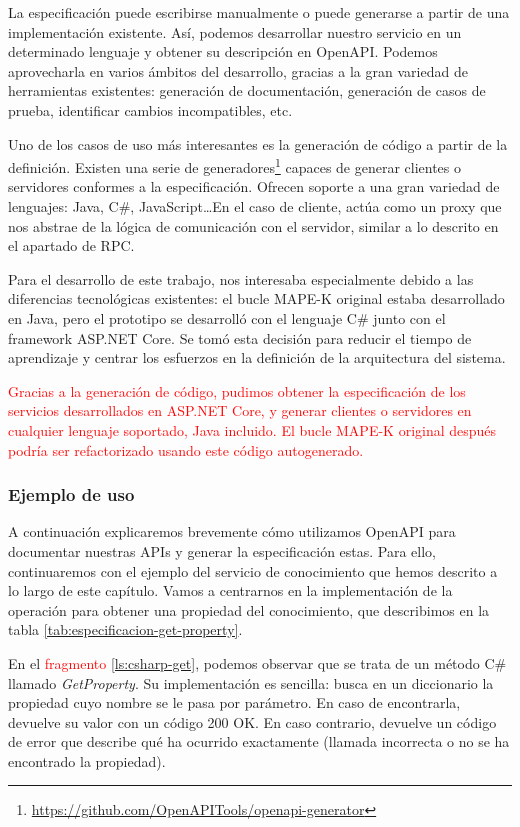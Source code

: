 La especificación puede escribirse manualmente o puede generarse a partir de una implementación existente. Así, podemos desarrollar nuestro servicio en un determinado lenguaje y obtener su descripción en OpenAPI. Podemos aprovecharla en varios ámbitos del desarrollo, gracias a la gran variedad de herramientas existentes: generación de documentación, generación de casos de prueba, identificar cambios incompatibles, etc. \cite{westerveldChapterOpenAPIAPI2021}

Uno de los casos de uso más interesantes es la generación de código a partir de la definición. Existen una serie de generadores\footnote{\url{https://github.com/OpenAPITools/openapi-generator}} capaces de generar clientes o servidores conformes a la especificación. Ofrecen soporte a una gran variedad de lenguajes: Java, C\#, JavaScript\dots En el caso de cliente, actúa como un proxy que nos abstrae de la lógica de comunicación con el servidor, similar a lo descrito en el apartado de RPC.

Para el desarrollo de este trabajo, nos interesaba especialmente debido a las diferencias tecnológicas existentes: el bucle MAPE-K original estaba desarrollado en Java, pero el prototipo se desarrolló con el lenguaje C\# junto con el framework ASP.NET Core. Se tomó esta decisión para reducir el tiempo de aprendizaje y centrar los esfuerzos en la definición de la arquitectura del sistema.

\textcolor{red}{Gracias a la generación de código, pudimos obtener la especificación de los servicios desarrollados en ASP.NET Core, y generar clientes o servidores en cualquier lenguaje soportado, Java incluido. El bucle MAPE-K original después podría ser refactorizado usando este código autogenerado.}

\subsubsection{Ejemplo de uso}

A continuación explicaremos brevemente cómo utilizamos OpenAPI para documentar nuestras APIs y generar la especificación estas. Para ello, continuaremos con el ejemplo del servicio de conocimiento que hemos descrito a lo largo de este capítulo. Vamos a centrarnos en la implementación de la operación para obtener una propiedad del conocimiento, que describimos en la tabla \ref{tab:especificacion-get-property}.

En el \textcolor{red}{fragmento} \ref{ls:csharp-get}, podemos observar que se trata de un método C\# llamado \textit{GetProperty}. Su implementación es sencilla: busca en un diccionario la propiedad cuyo nombre se le pasa por parámetro. En caso de encontrarla, devuelve su valor con un código 200 OK. En caso contrario, devuelve un código de error que describe qué ha ocurrido exactamente (llamada incorrecta o no se ha encontrado la propiedad).

